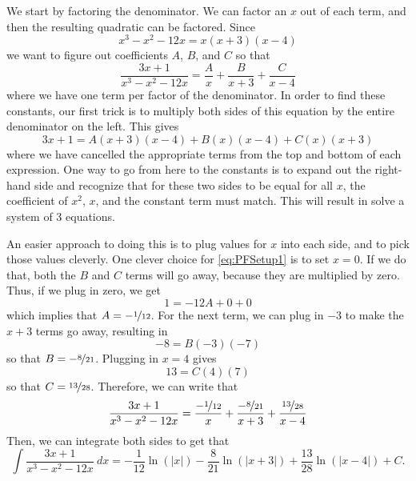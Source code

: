 \begin{exampleSol}
We start by factoring the denominator. We can factor an $x$ out of each term, and then the resulting quadratic can be factored. Since
\begin{equation*}
x^3 - x^2 - 12x = x(x+3)(x-4)
\end{equation*}
we want to figure out coefficients $A$, $B$, and $C$ so that
\begin{equation*}
\frac{3x + 1}{x^3 - x^2 - 12x} = \frac{A}{x} + \frac{B}{x+3} + \frac{C}{x-4} 
\end{equation*}
where we have one term per factor of the denominator. In order to find these constants, our first trick is to multiply both sides of this equation by the entire denominator on the left. This gives
\begin{equation} \label{eq:PFSetup1}
3x+1 = A(x+3)(x-4) + B(x)(x-4) + C(x)(x+3)
\end{equation}
where we have cancelled the appropriate terms from the top and bottom of each expression. One way to go from here to the constants is to expand out the right-hand side and recognize that for these two sides to be equal for all $x$, the coefficient of $x^2$, $x$, and the constant term must match. This will result in solve a system of 3 equations. 

An easier approach to doing this is to plug values for $x$ into each side, and to pick those values cleverly. One clever choice for \eqref{eq:PFSetup1} is to set $x=0$. If we do that, both the $B$ and $C$ terms will go away, because they are multiplied by zero. Thus, if we plug in zero, we get
\begin{equation*}
1 = -12A + 0 + 0
\end{equation*}
which implies that $A = -\nicefrac{1}{12}$. For the next term, we can plug in $-3$ to make the $x+3$ terms go away, resulting in
\begin{equation*}
-8 = B(-3)(-7)
\end{equation*} so that $B = -\nicefrac{8}{21}$. Plugging in $x=4$ gives
\begin{equation*}
13 = C(4)(7)
\end{equation*}
so that $C = \nicefrac{13}{28}$. Therefore, we can write that
\begin{equation*}
\frac{3x + 1}{x^3 - x^2 - 12x} = \frac{-\nicefrac{1}{12}}{x} + \frac{ -\nicefrac{8}{21}}{x+3} + \frac{\nicefrac{13}{28}}{x-4}
\end{equation*}
Then, we can integrate both sides to get that
\begin{equation*}
\int \frac{3x + 1}{x^3 - x^2 - 12x}\ dx = -\frac{1}{12}\ln(|x|) - \frac{8}{21}\ln(|x+3|) + \frac{13}{28} \ln(|x-4|) + C.
\end{equation*}
\end{exampleSol}

